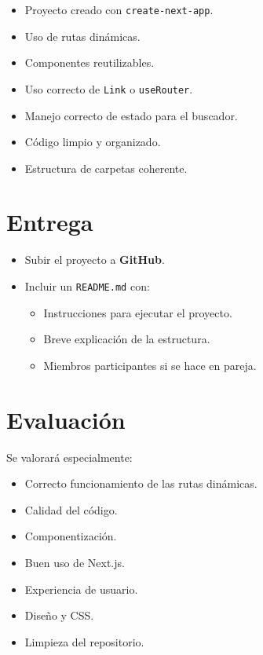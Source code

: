 \documentclass[12pt,a4paper]{article}
\begin{document}
\begin{itemize}
    \item Proyecto creado con \texttt{create-next-app}.
    \item Uso de rutas dinámicas.
    \item Componentes reutilizables.
    \item Uso correcto de \texttt{Link} o \texttt{useRouter}.
    \item Manejo correcto de estado para el buscador.
    \item Código limpio y organizado.
    \item Estructura de carpetas coherente.
\end{itemize}

\section*{Entrega}

\begin{itemize}
    \item Subir el proyecto a \textbf{GitHub}.
    \item Incluir un \texttt{README.md} con:
    \begin{itemize}
        \item Instrucciones para ejecutar el proyecto.
        \item Breve explicación de la estructura.
        \item Miembros participantes si se hace en pareja.
    \end{itemize}
\end{itemize}

\section*{Evaluación}

Se valorará especialmente:

\begin{itemize}
    \item Correcto funcionamiento de las rutas dinámicas.
    \item Calidad del código.
    \item Componentización.
    \item Buen uso de Next.js.
    \item Experiencia de usuario.
    \item Diseño y CSS.
    \item Limpieza del repositorio.
\end{itemize}
\end{document}
